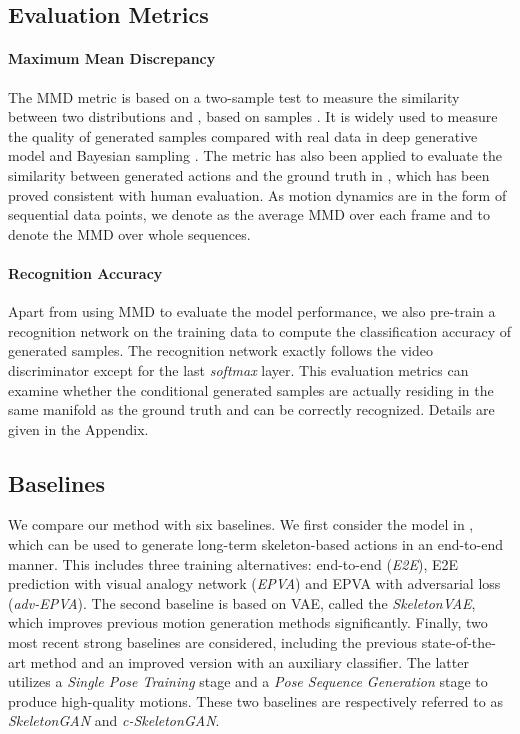 \documentclass[runningheads]{llncs}
\begin{document}
\subsection{Evaluation Metrics}
\paragraph{Maximum Mean Discrepancy} 
The MMD metric is based on a two-sample test to measure the similarity between two distributions  and , based on samples . It is widely used to measure the quality of generated samples compared with real data in deep generative model \cite{zhao2019self} and Bayesian sampling \cite{han2018stein}. The metric has also been applied to evaluate the similarity between generated actions and the ground truth in \cite{walker2017pose,wang2019learning}, which has been proved consistent with human evaluation. As motion dynamics are in the form of sequential data points, we denote  as the average MMD over each frame and  to denote the MMD over whole sequences.

\paragraph{Recognition Accuracy}
Apart from using MMD to evaluate the model performance, we also pre-train a recognition network on the training data to compute the classification accuracy of generated samples. The recognition network exactly follows the video discriminator except for the last \textit{softmax} layer. This evaluation metrics can examine whether the conditional generated samples are actually residing in the same manifold as the ground truth and can be correctly recognized. Details are given in the Appendix.

\subsection{Baselines}
We compare our method with six baselines. We first consider the model in \cite{wichers2018hierarchical}, which can be used to generate long-term skeleton-based actions in an end-to-end manner. This includes three training alternatives: end-to-end ({\it E2E}), E2E prediction with visual analogy network ({\it EPVA}) and EPVA with adversarial loss ({\it adv-EPVA}). The second baseline \cite{habibie2017recurrent} is based on VAE, called the {\it SkeletonVAE}, which improves previous motion generation methods significantly. Finally, two most recent strong baselines are considered, including the previous state-of-the-art method \cite{cai2018deep} and an improved version \cite{wang2019learning} with an auxiliary classifier. The latter utilizes a \textit{Single Pose Training} stage and a \textit{Pose Sequence Generation} stage to produce high-quality motions. These two baselines are respectively referred to as {\it SkeletonGAN} and {\it c-SkeletonGAN}.
\end{document}

